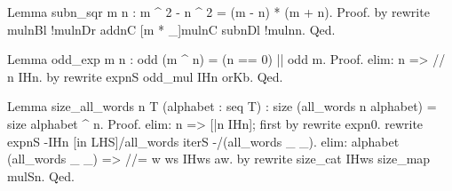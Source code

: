 \begin{Answer}[ref=ex:rewrite]

\begin{coq}{}{}
Lemma subn_sqr m n : m ^ 2 - n ^ 2 = (m - n) * (m + n).
Proof. by rewrite mulnBl !mulnDr addnC [m * _]mulnC subnDl !mulnn. Qed.
\end{coq}
\end{Answer}

\begin{Answer}[ref=ex:induction]

\begin{coq}{}{}
Lemma odd_exp m n : odd (m ^ n) = (n == 0) || odd m.
Proof.
elim: n => // n IHn.
by rewrite expnS odd_mul {}IHn orKb.
Qed.
\end{coq}
\end{Answer}

\begin{Answer}[ref=ex:induction2]

\begin{coq}{}{}
Lemma size_all_words n T (alphabet : seq T) :
  size (all_words n alphabet) = size alphabet ^ n.
Proof.
elim: n => [|n IHn]; first by rewrite expn0.
rewrite expnS -{}IHn [in LHS]/all_words iterS -/(all_words _ _).
elim: alphabet (all_words _ _) => //= w ws IHws aw.
by rewrite size_cat IHws size_map mulSn.
Qed.
\end{coq}
\end{Answer}











